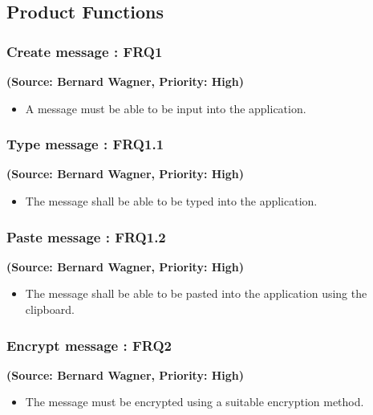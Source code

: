 \subsection{Product Functions}

\normalsize
\vspace{12pt}


\subsubsection{Create message : FRQ1}%
\textbf{(Source: Bernard Wagner, Priority: High)}
\begin{itemize}
\item A message must be able to be input  into the application.
\end{itemize}
\subsubsection{Type message : FRQ1.1}
\textbf{(Source: Bernard Wagner, Priority: High)}
\begin{itemize}
\item The message shall be able to be typed into the application.
\end{itemize}
\subsubsection{Paste message : FRQ1.2}
\textbf{(Source: Bernard Wagner, Priority: High)}
\begin{itemize}
\item The message shall be able to be pasted into the application using the clipboard.
\end{itemize}
\subsubsection{Encrypt message : FRQ2}
\textbf{(Source: Bernard Wagner, Priority: High)}
\begin{itemize}
\item The message must be encrypted using a suitable encryption method.
\end{itemize}
